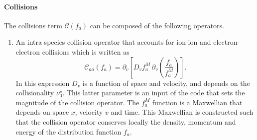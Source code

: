 \documentclass[11pt]{article}
\begin{document}
\paragraph{Collisions} The collisions term $\mathcal{C}(f_a)$ can be composed of the following operators.
\begin{enumerate}
\item An intra species collision operator \cite{Dif-Pradalier2011} that accounts for ion-ion and electron-electron collisions which is written as
%
\begin{equation} \label{eq:CollOp_1}
\mathcal{C}_{aa}(f_a) = \partial_{v} \left[ D_v f_{a}^{M} \, \partial_{v}
\left( \frac{f_a}{f_{a}^M} \right)\right].
\end{equation}
%
In this expression $D_v$ is a function of space and velocity, and depends on the collisionality $\nu_0^\star$. This latter parameter is an input of the code that sets the magnitude of the collision operator. The $f_a^{M}$ function is a Maxwellian that depends on space $x$, velocity $v$ and time.  This Maxwellian is constructed such that the collision operator conserves locally the density, momentum and energy of the distribution function $f_a$.
\end{enumerate}
  \clearpage
  \printbibliography
\end{document}
